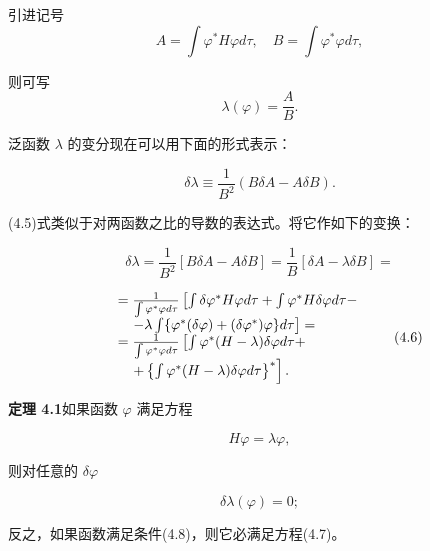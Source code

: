 引进记号
\begin{equation*}
A = \int \varphi^ {*} H \varphi d \tau , \quad B = \int \varphi^ {*} \varphi d \tau ,
\end{equation*}

则可写
\begin{equation*}
\lambda (\varphi) = \frac {A}{B}.\tag{4.4}
\end{equation*}

泛函数 $\lambda$ 的变分现在可以用下面的形式表示：

\begin{equation*}
\delta \lambda \equiv \frac {1}{B ^ {2}} (B \delta A - A \delta B).\tag{4.5}
\end{equation*}

(4.5)式类似于对两函数之比的导数的表达式。将它作如下的变换：

\begin{equation*}
\delta \lambda = \frac {1}{B ^ {2}} [ B \delta A - A \delta B ] = \frac {1}{B} [ \delta A - \lambda \delta B ] =
\end{equation*}

\begin{equation*}
\begin{array}{r l} & = \frac {1}{\int \varphi^ {*} \varphi d \tau} \left[ \int \delta \varphi^ {*} H \varphi d \tau + \int \varphi^ {*} H \delta \varphi d \tau - \right. \\ & \quad \left. - \lambda \int \{\varphi^ {*} (\delta \varphi) + (\delta \varphi^ {*}) \varphi \} d \tau \right] = \\ & = \frac {1}{\int \varphi^ {*} \varphi d \tau} \left[ \int \varphi^ {*} (H - \lambda) \delta \varphi d \tau + \right. \\ & \quad \left. + \left\{\int \varphi^ {*} (H - \lambda) \delta \varphi d \tau \right\} ^ {*} \right]. \end{array}\tag{4.6}
\end{equation*}

\textbf{定理 4.1}\quad 如果函数 $\varphi$ 满足方程

\begin{equation*}
H \varphi = \lambda \varphi ,\tag{4.7}
\end{equation*}

则对任意的 $\delta \varphi$

\begin{equation*}
\delta \lambda (\varphi) = 0;\tag{4.8}
\end{equation*}

反之，如果函数满足条件(4.8)，则它必满足方程(4.7)。

